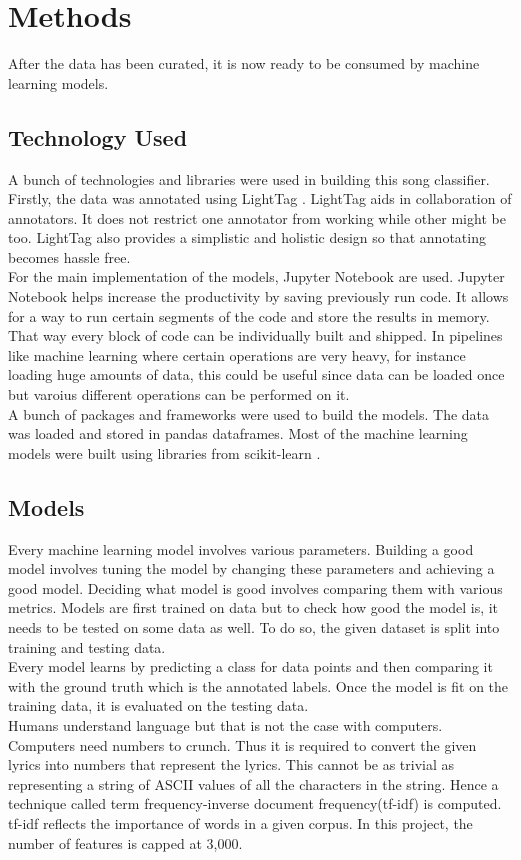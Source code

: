 \documentclass[11pt,a4paper]{article}
\begin{document}
\section{Methods}
\label{methods}
After the data has been curated, it is now ready to be consumed by machine learning models.

\subsection{Technology Used}
\label{techstack}
A bunch of technologies and libraries were used in building this song classifier. Firstly, the data was annotated using LightTag \cite{lighttag}. LightTag aids in collaboration of annotators. It does not restrict one annotator from working while other might be too. LightTag also provides a simplistic and holistic design so that annotating becomes hassle free.\\
For the main implementation of the models, Jupyter Notebook \cite{jupyter} are used. Jupyter Notebook helps increase the productivity by saving previously run code. It allows for a way to run certain segments of the code and store the results in memory. That way every block of code can be individually built and shipped. In pipelines like machine learning where certain operations are very heavy, for instance loading huge amounts of data, this could be useful since data can be loaded once but varoius different operations can be performed on it.\\
A bunch of packages and frameworks were used to build the models. The data was loaded and stored in pandas \cite{pandas} dataframes. Most of the machine learning models were built using libraries from scikit-learn \cite{sklearn}.

\subsection{Models}
\label{models}
Every machine learning model involves various parameters. Building a good model involves tuning the model by changing these parameters and achieving a good model. Deciding what model is good involves comparing them with various metrics. Models are first trained on data but to check how good the model is, it needs to be tested on some data as well. To do so, the given dataset is split into training and testing data.\\
Every model learns by predicting a class for data points and then comparing it with the ground truth which is the annotated labels. Once the model is fit on the training data, it is evaluated on the testing data.\\ 
Humans understand language but that is not the case with computers. Computers need numbers to crunch. Thus it is required to convert the given lyrics into numbers that represent the lyrics. This cannot be as trivial as representing a string of ASCII values of all the characters in the string. Hence a technique called term frequency-inverse document frequency(tf-idf) is computed. tf-idf reflects the importance of words in a given corpus. In this project, the number of features is capped at 3,000.\\
\end{document}
